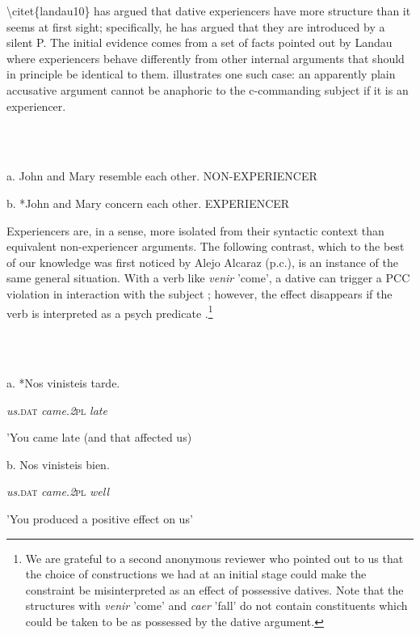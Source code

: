 \documentclass[output=paper,modfonts,nonflat]{langsci/langscibook}
\begin{document}
{\textbackslash}citet\{landau10\} has argued that dative experiencers have more structure than it seems at first sight; specifically, he has argued that they are introduced by a silent P. The initial evidence comes from a set of facts pointed out by Landau where experiencers behave differently from other internal arguments that should in principle be identical to them.  illustrates one such case: an apparently plain accusative argument cannot be anaphoric to the c-commanding subject if it is an experiencer.  

\ea%
    \label{ex:key:29}
    \gll\\
        \\
    \glt
    \z

          a. John and Mary resemble each other.    NON-EXPERIENCER

      b. *John and Mary concern each other.    EXPERIENCER

Experiencers are, in a sense, more isolated from their syntactic context than equivalent non-experiencer arguments. The following contrast, which to the best of our knowledge was first noticed by Alejo Alcaraz (p.c.), is an instance of the same general situation. With a verb like \textit{venir} 'come', a dative can trigger a PCC violation in interaction with the subject ; however, the effect disappears if the verb is interpreted as a psych predicate .\footnote{We are grateful to a second anonymous reviewer who pointed out to us that the choice of constructions we had at an initial stage could make the constraint be misinterpreted as an effect of possessive datives. Note that the structures with \textit{venir} 'come' and \textit{caer} 'fall' do not contain constituents which could be taken to be as possessed by the dative argument.}

\ea%
    \label{ex:key:30}
    \gll\\
        \\
    \glt
    \z

          a. *Nos     vinisteis   tarde.

            \textit{us}\textsc{.dat}   \textit{came.2}\textsc{pl}   \textit{late}

    {}'You came late (and that affected us)

    b.   Nos     vinisteis     bien.

          \textit{us}\textsc{.dat}  \textit{came.2}\textsc{pl}   \textit{well}

    {}'You produced a positive effect on us'
\end{document}
